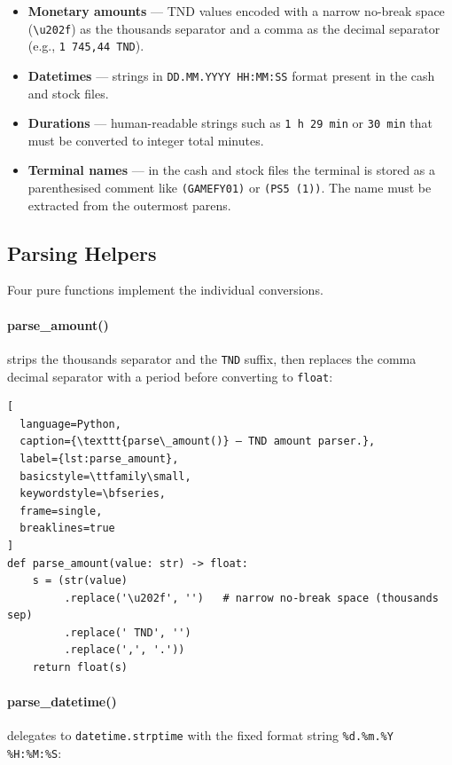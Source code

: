 \begin{itemize}
  \item \textbf{Monetary amounts} — TND values encoded with a narrow no-break
        space (\texttt{\textbackslash u202f}) as the thousands separator and a
        comma as the decimal separator (e.g., \texttt{1\,745,44 TND}).
  \item \textbf{Datetimes} — strings in \texttt{DD.MM.YYYY HH:MM:SS} format
        present in the cash and stock files.
  \item \textbf{Durations} — human-readable strings such as \texttt{1\,h\,29\,min}
        or \texttt{30\,min} that must be converted to integer total minutes.
  \item \textbf{Terminal names} — in the cash and stock files the terminal is
        stored as a parenthesised comment like \texttt{(GAMEFY01)} or
        \texttt{(PS5\,(1))}. The name must be extracted from the outermost parens.
\end{itemize}

\subsection{Parsing Helpers}

Four pure functions implement the individual conversions.

\paragraph{parse\_amount()} strips the thousands separator and the \texttt{TND}
suffix, then replaces the comma decimal separator with a period before converting
to \texttt{float}:

\begin{lstlisting}[
  language=Python,
  caption={\texttt{parse\_amount()} — TND amount parser.},
  label={lst:parse_amount},
  basicstyle=\ttfamily\small,
  keywordstyle=\bfseries,
  frame=single,
  breaklines=true
]
def parse_amount(value: str) -> float:
    s = (str(value)
         .replace('\u202f', '')   # narrow no-break space (thousands sep)
         .replace(' TND', '')
         .replace(',', '.'))
    return float(s)
\end{lstlisting}

\paragraph{parse\_datetime()} delegates to \texttt{datetime.strptime} with the
fixed format string \texttt{\%d.\%m.\%Y \%H:\%M:\%S}:


